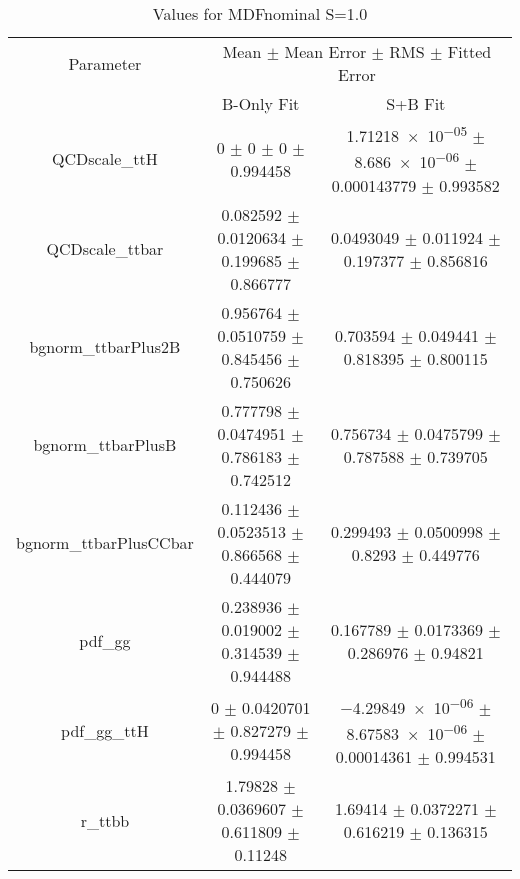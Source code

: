 \begin{table}
\centering
\caption{Values for MDFnominal S=1.0}
\begin{tabular}{ccc}
\toprule
Parameter & \multicolumn{2}{c}{Mean $\pm$ Mean Error $\pm$ RMS $\pm$ Fitted Error}\\
 & B-Only Fit & S+B Fit\\
\midrule
QCDscale\_ttH & \num{0} $\pm$ \num{0} $\pm$ \num{0} $\pm$ \num{0.994458} & \num{1.71218e-05} $\pm$ \num{8.686e-06} $\pm$ \num{0.000143779} $\pm$ \num{0.993582}\\
QCDscale\_ttbar & \num{0.082592} $\pm$ \num{0.0120634} $\pm$ \num{0.199685} $\pm$ \num{0.866777} & \num{0.0493049} $\pm$ \num{0.011924} $\pm$ \num{0.197377} $\pm$ \num{0.856816}\\
bgnorm\_ttbarPlus2B & \num{0.956764} $\pm$ \num{0.0510759} $\pm$ \num{0.845456} $\pm$ \num{0.750626} & \num{0.703594} $\pm$ \num{0.049441} $\pm$ \num{0.818395} $\pm$ \num{0.800115}\\
bgnorm\_ttbarPlusB & \num{0.777798} $\pm$ \num{0.0474951} $\pm$ \num{0.786183} $\pm$ \num{0.742512} & \num{0.756734} $\pm$ \num{0.0475799} $\pm$ \num{0.787588} $\pm$ \num{0.739705}\\
bgnorm\_ttbarPlusCCbar & \num{0.112436} $\pm$ \num{0.0523513} $\pm$ \num{0.866568} $\pm$ \num{0.444079} & \num{0.299493} $\pm$ \num{0.0500998} $\pm$ \num{0.8293} $\pm$ \num{0.449776}\\
pdf\_gg & \num{0.238936} $\pm$ \num{0.019002} $\pm$ \num{0.314539} $\pm$ \num{0.944488} & \num{0.167789} $\pm$ \num{0.0173369} $\pm$ \num{0.286976} $\pm$ \num{0.94821}\\
pdf\_gg\_ttH & \num{0} $\pm$ \num{0.0420701} $\pm$ \num{0.827279} $\pm$ \num{0.994458} & \num{-4.29849e-06} $\pm$ \num{8.67583e-06} $\pm$ \num{0.00014361} $\pm$ \num{0.994531}\\
r\_ttbb & \num{1.79828} $\pm$ \num{0.0369607} $\pm$ \num{0.611809} $\pm$ \num{0.11248} & \num{1.69414} $\pm$ \num{0.0372271} $\pm$ \num{0.616219} $\pm$ \num{0.136315}\\
\bottomrule
\end{tabular}
\end{table}